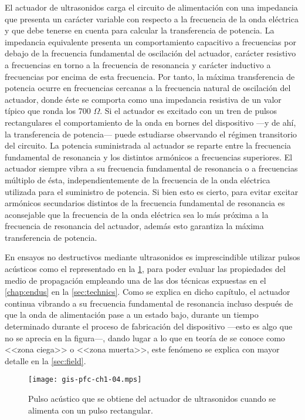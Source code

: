 El actuador de ultrasonidos carga el circuito de alimentación con una
impedancia que presenta un carácter variable con respecto a la frecuencia
de la onda eléctrica y que debe tenerse en cuenta para calcular la
transferencia de potencia. La impedancia equivalente presenta un
comportamiento capacitivo a frecuencias por debajo de la frecuencia
fundamental de oscilación del actuador, carácter resistivo a frecuencias en
torno a la frecuencia de resonancia y carácter inductivo a frecuencias por
encima de esta frecuencia. Por tanto, la máxima transferencia de potencia
ocurre en frecuencias cercanas a la frecuencia natural de oscilación del
actuador, donde éste se comporta como una impedancia resistiva de un valor
típico que ronda los 700 $\Omega$. Si el actuador es excitado con un tren
de pulsos rectangulares el comportamiento de la onda en bornes del
dispositivo ---y de ahí, la transferencia de potencia--- puede estudiarse
observando el régimen transitorio del circuito. La potencia suministrada al
actuador se reparte entre la frecuencia fundamental de resonancia y los
distintos armónicos a frecuencias superiores. El actuador siempre vibra a
su frecuencia fundamental de resonancia o a frecuencias múltiplo de ésta,
independientemente de la frecuencia de la onda eléctrica utilizada para el
suministro de potencia. Si bien esto es cierto, para evitar excitar
armónicos secundarios distintos de la frecuencia fundamental de resonancia
es aconsejable que la frecuencia de la onda eléctrica sea lo más próxima a
la frecuencia de resonancia del actuador, además esto garantiza la máxima
transferencia de potencia.

En ensayos no destructivos mediante ultrasonidos es imprescindible utilizar
pulsos acústicos como el representado en la \cref{fig:pulse}, para poder
evaluar las propiedades del medio de propagación empleando una de las dos
técnicas expuestas en el \cref{chap:endus} en la \cref{sec:technics}. Como
se explica en dicho capítulo, el actuador continua vibrando a su frecuencia
fundamental de resonancia incluso después de que la onda de alimentación
pase a un estado bajo, durante un tiempo determinado durante el proceso de
fabricación del dispositivo ---esto es algo que no se aprecia en la
figura---, dando lugar a lo que en teoría de  se conoce como
<<zona ciega>> o <<zona muerta>>, este fenómeno se explica con mayor
detalle en la \cref{sec:field}.

\begin{figure}
	\begin{center}
		\texttt{[image: gis-pfc-ch1-04.mps]}
	\end{center}
	\caption[Pulso acústico generado por el actuador de
	ultrasonidos]{Pulso acústico que se obtiene del actuador de
	ultrasonidos cuando se alimenta con un pulso rectangular.}
	\label{fig:pulse}
\end{figure}


